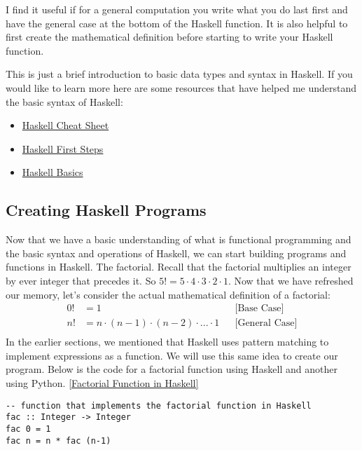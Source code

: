 \documentclass{article}
\begin{document}
\vspace{\baselineskip}
I find it useful if for a general computation you write what you do last first and have the general case at the bottom of the Haskell function. It is also helpful to first create the mathematical definition before starting to write your Haskell function.

\vspace{\baselineskip}
This is just a brief introduction to basic data types and syntax in Haskell. If you would like to learn more here are some resources that have helped me understand the basic syntax of Haskell:
\begin{itemize}
  \item \href{http://cheatsheet.codeslower.com/CheatSheet.pdf}{Haskell Cheat Sheet}
  \item \href{http://learn.hfm.io/first_steps.html}{Haskell First Steps}
  \item \href{https://www.schoolofhaskell.com/school/starting-with-haskell/introduction-to-haskell/1-haskell-basics}{Haskell Basics}
\end{itemize}

\subsection{Creating Haskell Programs}
Now that we have a basic understanding of what is functional programming and the basic syntax and operations of Haskell, we can start building programs and functions in Haskell. The factorial. Recall that the factorial multiplies an integer by ever integer that precedes it. So $5! = 5\cdot4\cdot3\cdot2\cdot1$. Now that we have refreshed our memory, let's consider the actual mathematical definition of a factorial:
\begin{align*}
    0! &= 1 &&\text{[Base Case]}\\
    n! &= n\cdot (n-1)\cdot (n-2)\cdot ... \cdot 1 &&\text{[General Case]}\\
\end{align*}
In the earlier sections, we mentioned that Haskell uses pattern matching to implement expressions as a function. We will use this same idea to create our program. Below is the code for a factorial function using Haskell and another using Python. \href{https://replit.com/@ArielGutierrez/recursionfactorial#main.hs}{[Factorial Function in Haskell]}
\begin{lstlisting}
-- function that implements the factorial function in Haskell
fac :: Integer -> Integer
fac 0 = 1
fac n = n * fac (n-1)
\end{lstlisting}
\end{document}
